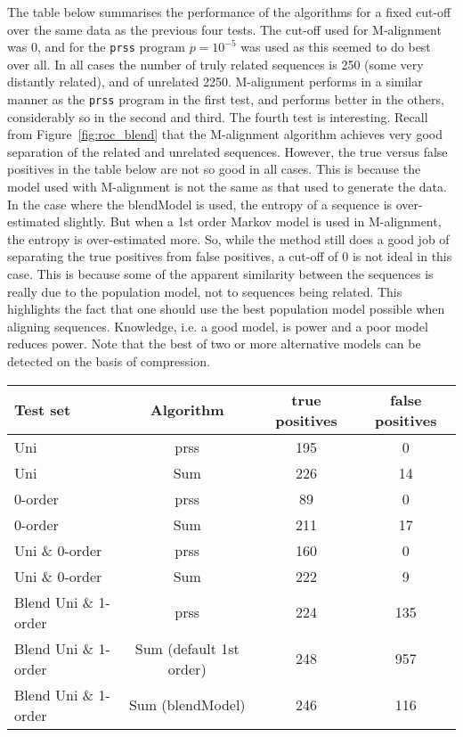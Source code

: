 \documentclass[a4paper,11pt,oneside]{article}
\begin{document}
The table below summarises the performance of the algorithms for a fixed
cut-off over the same data as the previous four tests.  The cut-off used for
M-alignment was 0, and for the \verb!prss! program $p=10^{-5}$ was used as
this seemed to do best over all.  In all cases the number of truly related
sequences is 250 (some very distantly related), and of unrelated 2250.
M-alignment performs in a similar manner as the \verb!prss! program in the
first test, and performs better in the others, considerably so in the second
and third.  The fourth test is interesting.  Recall from
Figure~\ref{fig:roc_blend} that the M-alignment algorithm achieves very good
separation of the related and unrelated sequences.  However, the true versus
false positives in the table below are not so good in all cases.  This is
because the model used with M-alignment is not the same as that used to
generate the data.  In the case where the blendModel is used, the entropy of a
sequence is over-estimated slightly.  But when a 1st order Markov model is
used in M-alignment, the entropy is over-estimated more.  So, while the method
still does a good job of separating the true positives from false positives, a
cut-off of 0 is not ideal in this case.  This is because some of the apparent
similarity between the sequences is really due to the population model, not to
sequences being related.  This highlights the fact that one should use the
best population model possible when aligning sequences. Knowledge, i.e. a good
model, is power and a poor model reduces power. Note that the best of two or
more alternative models can be detected on the basis of compression.

\begin{center}
\begin{tabular}{|l|c||c|c|} \hline
Test set & Algorithm & true positives & false positives \\ \hline
Uni &  prss & 195 & 0  \\ 
Uni & Sum & 226 & 14  \\ \hline

0-order & prss & 89 & 0  \\ 
0-order & Sum & 211 & 17  \\ \hline

Uni \& 0-order & prss & 160 & 0  \\ 
Uni \& 0-order & Sum & 222 & 9  \\  \hline

Blend Uni \& 1-order & prss & 224 & 135  \\ 
Blend Uni \& 1-order & Sum (default 1st order) & 248 & 957 \\ 
Blend Uni \& 1-order & Sum (blendModel) & 246 & 116 \\ 
\hline \end{tabular}
\end{center}
\end{document}
